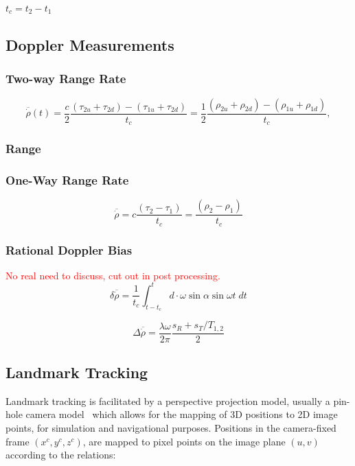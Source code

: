 $t_c = t_2 - t_1$

\subsection{Doppler Measurements}


\subsubsection{Two-way Range Rate}
\begin{equation}
    \overline{\dot{\rho}}(t) = \frac{c}{2}\frac{(\tau_{2u}+\tau_{2d})-(\tau_{1u}+\tau_{2d})}{t_c} = \frac{1}{2}\frac{(\rho_{2u}+\rho_{2d})-(\rho_{1u} + \rho_{1d})}{t_c},
\end{equation}

\subsubsection{Range}

\subsubsection{One-Way Range Rate}
\begin{equation}
    \overline{\dot{\rho}} = c\frac{(\tau_2-\tau_1)}{t_c}=\frac{(\rho_2-\rho_1)}{t_c}
\end{equation}

\subsubsection{Rational Doppler Bias}
\textcolor{red}{No real need to discuss, cut out in post processing.}
\begin{equation}
    \delta\overline{\dot{\rho}} = \frac{1}{t_c}\int_{t-t_c}^{t}d\cdot{\omega\sin{\alpha}\sin{\omega{t}}\;dt}
\end{equation}

\begin{equation}
    \Delta{\overline{\dot{\rho}}} = \frac{\lambda\omega}{2\pi}\frac{s_R+s_T/T_{1,2}}{2}
\end{equation}



\subsection{Landmark Tracking}

Landmark tracking is facilitated by a perspective projection model, usually a
pin-hole camera model~\cite{Shuang2008} which allows for the mapping of 3D
positions to 2D image points, for simulation and navigational purposes.
Positions in the camera-fixed frame $(x^c, y^c, z^c)$, are mapped to pixel
points on the image plane $(u,v)$ according to the relations:

